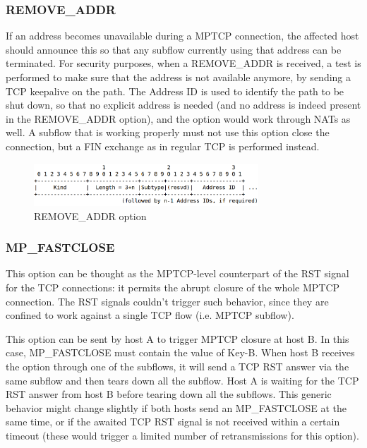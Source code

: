 \subsubsection{REMOVE\_ADDR}
If an address becomes unavailable during a MPTCP connection, the affected host should announce this so that any subflow currently using that address can be terminated. For security purposes, when a REMOVE\_ADDR is received, a test is performed to make sure that the address is not available anymore, by sending a TCP keepalive on the path.
The Address ID is used to identify the path to be shut down, so that no explicit address is needed (and no address is indeed present in the REMOVE\_ADDR option), and the option would work through NATs as well. 
A subflow that is working properly must not use this option close the connection, but a FIN exchange as in regular TCP is performed instead.

\begin{figure}[!htb]
\centering
\includegraphics[width=0.75\textwidth]{images/opt_remove}
\caption{REMOVE\_ADDR option}
\label{fig:opt_remove}
\end{figure}



\subsubsection{MP\_FASTCLOSE}
This option can be thought as the MPTCP-level counterpart of the RST signal for the TCP connections: it permits the abrupt closure of the whole MPTCP connection. The RST signals couldn't trigger such behavior, since they are confined to work against a single TCP flow (i.e. MPTCP subflow).

This option can be sent by host A to trigger MPTCP closure at host B. In this case, MP\_FASTCLOSE must contain the value of Key-B. When host B receives the option through one of the subflows, it will send a TCP RST answer via the same subflow and then tears down all the subflow. Host A is waiting for the TCP RST answer from host B before tearing down all the subflows. This generic behavior might change slightly if both hosts send an MP\_FASTCLOSE at the same time, or if the awaited TCP RST signal is not received within a certain timeout (these would trigger a limited number of retransmissions for this option).

